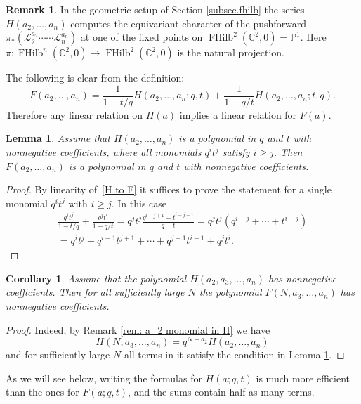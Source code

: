 \documentclass[11pt,reqno]{amsart}
\newtheorem{lemma}[theorem]{Lemma}
\newtheorem{corollary}[theorem]{Corollary}
\theoremstyle{definition}
\newtheorem{remark}[theorem]{Remark}
\numberwithin{equation}{section}
\DeclareMathOperator{\FHilb}{FHilb}
\newcommand{\CC}{\mathbb{C}}
\newcommand{\CL}{\mathcal{L}}
\begin{document}
\begin{remark}
In the geometric setup of Section \ref{subsec.fhilb}
the series $H(a_2,\ldots,a_n)$ computes the equivariant character of the pushforward 
$\pi_*(\CL_2^{a_2}\cdots \cdots \CL_n^{a_n})$ at one of the fixed points on $\FHilb^2(\CC^2,0)=\mathbb{P}^1$. 
Here $\pi \colon \FHilb^n(\CC^2,0)\to \FHilb^2(\CC^2,0)$ is the natural projection.
\end{remark}

The following  is clear from the definition:
\begin{equation}
\label{H to F}
	F(a_2,\ldots,a_n)=\frac{1}{1-t/q}H(a_2,\ldots,a_n;q,t)+\frac{1}{1-q/t}H(a_2,\ldots,a_n;t,q).
\end{equation}
Therefore any linear relation on $H(a)$ implies a linear relation for $F(a)$.

\begin{lemma}
\label{lem:positivity from H}
Assume that $H(a_2,\ldots,a_n)$ is a polynomial in $q$ and $t$ with nonnegative coefficients, where all monomials $q^it^j$
satisfy $i\geqslant j$. Then $F(a_2,\ldots,a_n)$ is a polynomial in $q$ and $t$ with nonnegative coefficients.
\end{lemma}

\begin{proof}
By linearity of~\eqref{H to F} it suffices to prove the statement for a single monomial $q^it^j$ with $i\geqslant j$. In this case
\begin{multline*}
	\frac{q^it^j}{1-t/q}+\frac{q^jt^i}{1-q/t}=q^jt^j\frac{q^{i-j+1}-t^{i-j+1}}{q-t}=q^jt^j(q^{i-j}+\cdots+t^{i-j})\\
	=q^it^j+q^{i-1}t^{j+1}+\cdots+q^{j+1}t^{i-1}+q^{j}t^{i}.
\end{multline*}
\end{proof}

\begin{corollary}
Assume that the polynomial $H(a_2,a_3,\ldots,a_n)$ has nonnegative coefficients. Then for all sufficiently large $N$ the polynomial $F(N,a_3,\ldots,a_n)$ has nonnegative coefficients.
\end{corollary}
\begin{proof}
Indeed, by Remark \ref{rem: a_2 monomial in H} we have
$$
H(N,a_3,\ldots,a_n)=q^{N-a_2}H(a_2,\ldots,a_n)
$$
and for sufficiently large $N$ all terms in it satisfy the condition in Lemma \ref{lem:positivity from H}.
\end{proof}

As we will see below, writing the formulas for $H(a;q,t)$ is much more efficient than the ones for $F(a;q,t)$, and the sums 
contain half as many terms.
\end{document}
